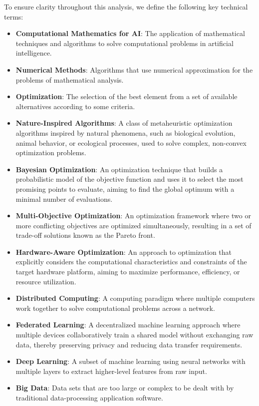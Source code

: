 \documentclass[format=acmsmall, natbib=true, citestyle=acmauthoryear]{acmart}
\begin{document}
To ensure clarity throughout this analysis, we define the following key technical terms:
\begin{itemize}
    \item \textbf{Computational Mathematics for AI}: The application of mathematical techniques and algorithms to solve computational problems in artificial intelligence.
    \item \textbf{Numerical Methods}: Algorithms that use numerical approximation for the problems of mathematical analysis.
    \item \textbf{Optimization}: The selection of the best element from a set of available alternatives according to some criteria.
    \item \textbf{Nature-Inspired Algorithms}: A class of metaheuristic optimization algorithms inspired by natural phenomena, such as biological evolution, animal behavior, or ecological processes, used to solve complex, non-convex optimization problems.
    \item \textbf{Bayesian Optimization}: An optimization technique that builds a probabilistic model of the objective function and uses it to select the most promising points to evaluate, aiming to find the global optimum with a minimal number of evaluations.
    \item \textbf{Multi-Objective Optimization}: An optimization framework where two or more conflicting objectives are optimized simultaneously, resulting in a set of trade-off solutions known as the Pareto front.
    \item \textbf{Hardware-Aware Optimization}: An approach to optimization that explicitly considers the computational characteristics and constraints of the target hardware platform, aiming to maximize performance, efficiency, or resource utilization.
    \item \textbf{Distributed Computing}: A computing paradigm where multiple computers work together to solve computational problems across a network.
    \item \textbf{Federated Learning}: A decentralized machine learning approach where multiple devices collaboratively train a shared model without exchanging raw data, thereby preserving privacy and reducing data transfer requirements.
    \item \textbf{Deep Learning}: A subset of machine learning using neural networks with multiple layers to extract higher-level features from raw input.
    \item \textbf{Big Data}: Data sets that are too large or complex to be dealt with by traditional data-processing application software.

\end{itemize}
\end{document}
